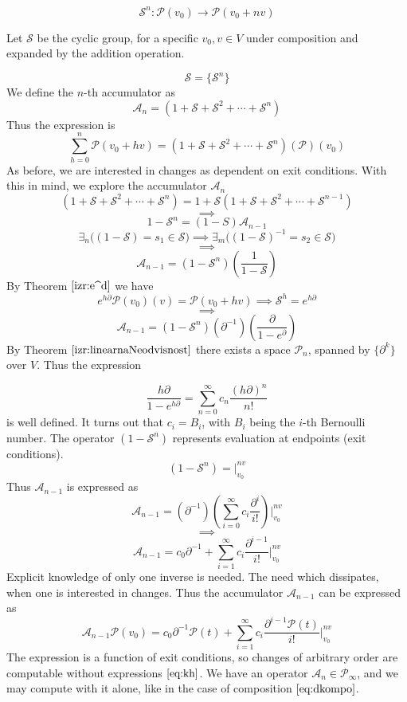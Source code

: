 \documentclass{article}
\newcommand{\Shift}{\mathcal{S}}
\newcommand{\dP}{\mathcal{P}}
\newcommand{\D}{\partial}
\begin{document}
   \begin{equation}
   \Shift^n:\dP(v_0)\to \dP(v_0+nv)
   \end{equation}
    
    Let $\Shift$ be the cyclic group, for a specific $v_0, v\in V$ under composition and expanded by the addition operation.
    
   $$\Shift=\{\Shift^n\}$$   
   We define the $n$-th accumulator as 
   $$\mathcal{A}_n=(1+\Shift+\Shift^2+\cdots+\Shift^n)$$ Thus the expression is
   $$\sum\limits_{h=0}^{n}\dP(v_0+hv)=(1+\Shift+\Shift^2+\cdots+\Shift^n)(\dP)(v_0)$$
   As before, we are interested in changes as dependent on exit conditions. With this in mind, we explore the accumulator $\mathcal{A}_n$
   $$(1+\Shift+\Shift^2+\cdots+\Shift^n)=1+\Shift(1+\Shift+\Shift^2+\cdots+\Shift^{n-1})$$
   $$\implies$$
   $$1-\Shift^n=(1-S)\mathcal{A}_{n-1}$$
   $$\exists_n\Big((1-\Shift)=s_1\in\Shift\Big)\implies \exists_m\Big((1-\Shift)^{-1}=s_2\in \Shift\Big)$$
   $$\implies$$
   $$\mathcal{A}_{n-1}=(1-\Shift^n)(\frac{1}{1-\Shift})$$
   By Theorem $\ref{izr:e^d}$ we have
   $$e^{h\D}\dP(v_0)(v)=\dP(v_0+hv)\implies \Shift^h=e^{h\D}$$
   $$\implies$$
   $$\mathcal{A}_{n-1}=(1-\Shift^n)(\D^{-1})(\frac{\D}{1-e^{\D}})$$
   By Theorem $\ref{izr:linearnaNeodvisnost}$  there exists a space $\dP_n$, spanned by $\{\D^k\}$ over $V$. Thus the expression   
     
    \begin{equation}
    	\frac{h\D}{1-e^{h\D}}=\sum\limits_{n=0}^{\infty}c_n\frac{(h\D)^n}{n!}
    \end{equation}
    is well defined. It turns out that $c_i=B_i$, with $B_i$ being the $i$-th Bernoulli number. The operator $(1-\Shift^n)$ represents evaluation at endpoints (exit conditions).
    $$(1-\Shift^n)=\Bigg\vert_{v_0}^{nv}$$
    Thus $\mathcal{A}_{n-1}$ is expressed as
    $$\mathcal{A}_{n-1}=(\D^{-1})(\sum\limits_{i=0}^{\infty}c_i\frac{\D^i}{i!})\Bigg\vert_{v_0}^{nv}$$
    $$\implies$$
    \begin{equation}
    \mathcal{A}_{n-1}=c_0\D^{-1}+\sum\limits_{i=1}^{\infty}c_i\frac{\D^{i-1}}{i!}\Bigg\vert_{v_0}^{nv}
    \end{equation}
    Explicit knowledge of only one inverse is needed. The need which dissipates, when one is interested in changes. Thus the accumulator  $\mathcal{A}_{n-1}$ can be expressed as
    \begin{equation}
    	\mathcal{A}_{n-1}\dP(v_0)=c_0\D^{-1}\dP(t)+\sum\limits_{i=1}^{\infty}c_i\frac{\D^{i-1}\dP(t)}{i!}\Bigg\vert_{v_0}^{nv}
    \end{equation}
    The expression is a function of exit conditions, so changes of arbitrary order are computable without expressions $\eqref{eq:kh}$. We have an operator $\mathcal{A}_n\in\dP_\infty$, and we may compute with it alone, like in the case of composition $\eqref{eq:dkompo}$.
\end{document}
